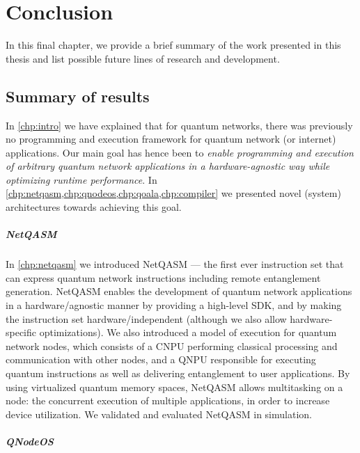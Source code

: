 \chapter{Conclusion}
\label{chp:conclusion}

In this final chapter, we provide a brief summary of the work presented in this thesis and list possible future lines of research and development.

\section{Summary of results}
In \cref{chp:intro} we have explained that for quantum networks, there was previously no programming and execution framework for quantum network (or internet) applications.
Our main goal has hence been to \emph{enable programming and execution of arbitrary quantum network applications in a hardware-agnostic way while optimizing runtime performance}.
In \cref{chp:netqasm,chp:qnodeos,chp:qoala,chp:compiler} we presented novel (system) architectures towards achieving this goal.


\paragraph{NetQASM}
In \cref{chp:netqasm} we introduced NetQASM --- the first ever instruction set that can express quantum network instructions including remote entanglement generation.
NetQASM enables the development of quantum network applications in a hardware\-/agnostic manner by providing a high-level SDK, and by making the instruction set hardware\-/independent (although we also allow hardware-specific optimizations).
We also introduced a model of execution for quantum network nodes, which consists of a CNPU performing classical processing and communication with other nodes, and a QNPU responsible for executing quantum instructions as well as delivering entanglement to user applications.
By using virtualized quantum memory spaces, NetQASM allows multitasking on a node: the concurrent execution of multiple applications, in order to increase device utilization.
We validated and evaluated NetQASM in simulation.


\paragraph{QNodeOS}

